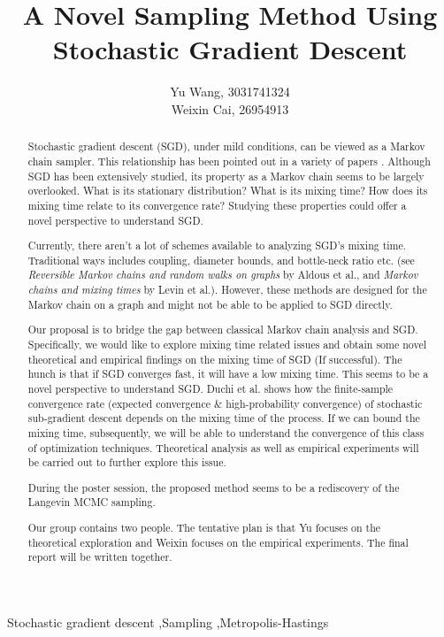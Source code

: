 \documentclass[preprint,12pt,3p]{elsarticle}
\begin{document}
\begin{frontmatter}

\title{A Novel Sampling Method Using Stochastic Gradient Descent}


\author{Yu Wang, 3031741324\\ Weixin Cai, 26954913}

\begin{abstract}
Stochastic gradient descent (SGD), under mild conditions, can be viewed as a Markov chain sampler. This relationship has been pointed out in a variety of papers \cite{kushner2012stochastic, bach2014adaptivity}. Although SGD has been extensively studied, its property as a Markov chain seems to be largely overlooked. What is its stationary distribution? What is its mixing time? How does its mixing time relate to its convergence rate? Studying these properties could offer a novel perspective to understand SGD.

Currently, there aren't a lot of schemes available to analyzing SGD's mixing time. Traditional ways includes coupling, diameter bounds, and bottle-neck ratio etc. (see \emph{Reversible Markov chains and random walks on graphs} by Aldous et al.\cite{aldous2002reversible}, and \emph{Markov chains and mixing times} by Levin et al.\cite{levin2009markov}). However, these methods are designed for the Markov chain on a graph and might not be able to be applied to SGD directly.

Our proposal is to bridge the gap between classical Markov chain analysis and SGD. Specifically,  we would like to explore mixing time related issues and obtain some novel theoretical and empirical findings on the mixing time of SGD (If successful). The hunch is that if SGD converges fast, it will have a low mixing time. This seems to be a novel perspective to understand SGD. Duchi et al.\cite{duchi2012ergodic} shows how the finite-sample convergence rate (expected convergence \& high-probability convergence) of stochastic sub-gradient descent depends on the mixing time of the process. If we can bound the mixing time, subsequently, we will be able to understand the convergence of this class of optimization techniques. Theoretical analysis as well as empirical experiments will be carried out to further explore this issue.

During the poster session, the proposed method seems to be a rediscovery of the Langevin MCMC sampling. 

Our group contains two people. The tentative plan is that Yu focuses on the theoretical exploration and Weixin focuses on the empirical experiments. The final report will be written together.
\end{abstract}

\begin{keyword}
Stochastic gradient descent \sep Sampling \sep Metropolis-Hastings
\end{keyword}

\end{frontmatter}
\end{document}
